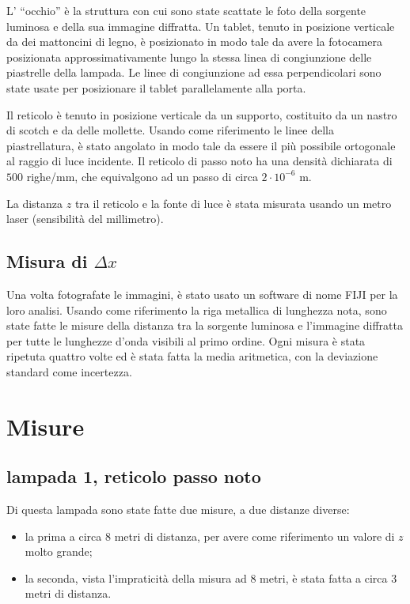 \documentclass{article}
\begin{document}
L' ``occhio'' è la struttura con cui sono state scattate le foto della sorgente luminosa e della sua immagine diffratta. Un tablet, tenuto in posizione verticale da dei mattoncini di legno, è posizionato in modo tale da avere la fotocamera posizionata approssimativamente lungo la stessa linea di congiunzione delle piastrelle della lampada. Le linee di congiunzione ad essa perpendicolari sono state usate per posizionare il tablet parallelamente alla porta.

\vspace{5mm}

Il reticolo è tenuto in posizione verticale da un supporto, costituito da un nastro di scotch e da delle mollette. Usando come riferimento le linee della piastrellatura, è stato angolato in modo tale da essere il più possibile ortogonale al raggio di luce incidente. Il reticolo di passo noto ha una densità dichiarata di $500$ righe/mm, che equivalgono ad un passo di circa $2 \cdot 10^{-6}$ m.

\vspace{5mm}

La distanza $z$ tra il reticolo e la fonte di luce è stata misurata usando un metro laser (sensibilità del millimetro).

\subsection{Misura di $\Delta x$}

Una volta fotografate le immagini, è stato usato un software di nome FIJI per la loro analisi. Usando come riferimento la riga metallica di lunghezza nota, sono state fatte le misure della distanza tra la sorgente luminosa e l'immagine diffratta per tutte le lunghezze d'onda visibili al primo ordine. Ogni misura è stata ripetuta quattro volte ed è stata fatta la media aritmetica, con la deviazione standard come incertezza. 

\section{Misure}

\subsection{lampada 1, reticolo passo noto}

Di questa lampada sono state fatte due misure, a due distanze diverse:

\begin{itemize}
  \item la prima a circa 8 metri di distanza, per avere come riferimento un valore di $z$ molto grande; 
  \item la seconda, vista l'impraticità della misura ad 8 metri, è stata fatta a circa 3 metri di distanza.

\end{itemize}
\end{document}

